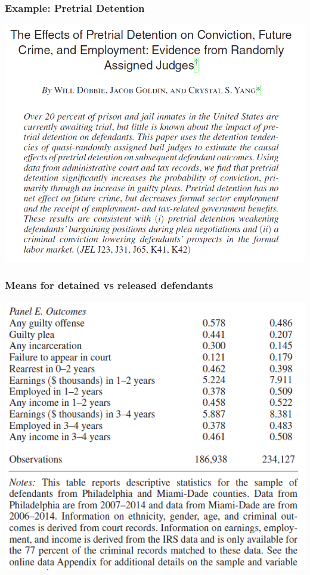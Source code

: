 \begin{frame}
  \frametitle{Example: Pretrial Detention}
  \begin{center}
    \includegraphics[width=.9\textwidth]{./resources/DobbieAbstract}
  \end{center}  
\end{frame}

\begin{frame}
  \frametitle{Means for detained vs released defendants}
  \begin{center}
    \includegraphics[width=.9\textwidth]{./resources/DobbieStats}
  \end{center}  
\end{frame}

